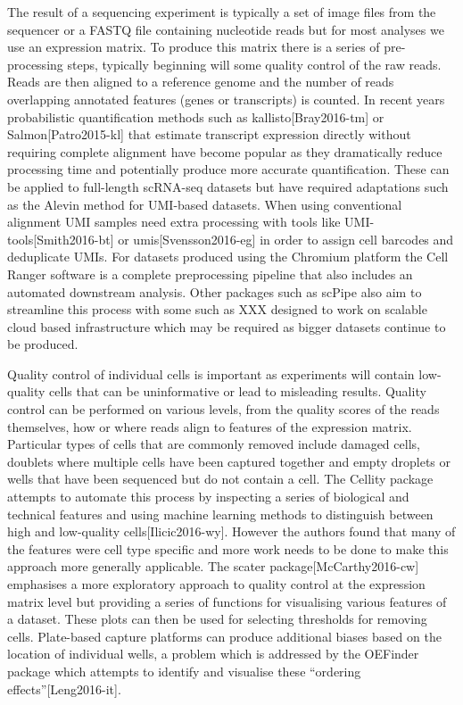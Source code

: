 \documentclass[11pt,a4paper,titlepage,twoside,openright]{style/unimelbthesis}
\theoremstyle{definition}
\theoremstyle{definition}
\theoremstyle{definition}
\theoremstyle{remark}
\begin{document}
\begin{mainmatter}
The result of a sequencing experiment is typically a set of image files from the sequencer or a FASTQ file containing nucleotide reads but for most analyses we use an expression matrix. To produce this matrix there is a series of pre-processing steps, typically beginning will some quality control of the raw reads. Reads are then aligned to a reference genome and the number of reads overlapping annotated features (genes or transcripts) is counted. In recent years probabilistic quantification methods such as kallisto{[}Bray2016-tm{]} or Salmon{[}Patro2015-kl{]} that estimate transcript expression directly without requiring complete alignment have become popular as they dramatically reduce processing time and potentially produce more accurate quantification. These can be applied to full-length scRNA-seq datasets but have required adaptations such as the Alevin method for UMI-based datasets. When using conventional alignment UMI samples need extra processing with tools like UMI-tools{[}Smith2016-bt{]} or umis{[}Svensson2016-eg{]} in order to assign cell barcodes and deduplicate UMIs. For datasets produced using the Chromium platform the Cell Ranger software is a complete preprocessing pipeline that also includes an automated downstream analysis. Other packages such as scPipe also aim to streamline this process with some such as XXX designed to work on scalable cloud based infrastructure which may be required as bigger datasets continue to be produced.

Quality control of individual cells is important as experiments will contain low-quality cells that can be uninformative or lead to misleading results. Quality control can be performed on various levels, from the quality scores of the reads themselves, how or where reads align to features of the expression matrix. Particular types of cells that are commonly removed include damaged cells, doublets where multiple cells have been captured together and empty droplets or wells that have been sequenced but do not contain a cell. The Cellity package attempts to automate this process by inspecting a series of biological and technical features and using machine learning methods to distinguish between high and low-quality cells{[}Ilicic2016-wy{]}. However the authors found that many of the features were cell type specific and more work needs to be done to make this approach more generally applicable. The scater package{[}McCarthy2016-cw{]} emphasises a more exploratory approach to quality control at the expression matrix level but providing a series of functions for visualising various features of a dataset. These plots can then be used for selecting thresholds for removing cells. Plate-based capture platforms can produce additional biases based on the location of individual wells, a problem which is addressed by the OEFinder package which attempts to identify and visualise these ``ordering effects''{[}Leng2016-it{]}.


\end{mainmatter}
\end{document}
